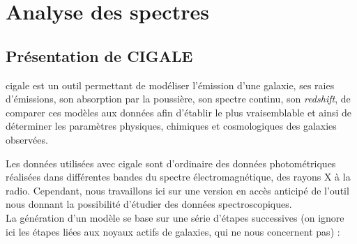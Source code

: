 \documentclass[12pt, a4paper]{article}
\begin{document}
\section{Analyse des spectres}

\subsection{Présentation de CIGALE}

\gls{cigale} \parencite{cigale} est un outil permettant de modéliser l'émission d'une galaxie, ses raies d'émissions, son absorption par la poussière, son spectre continu, son \textit{redshift}, de comparer ces modèles aux données afin d'établir le plus vraisemblable et ainsi de déterminer les paramètres physiques, chimiques et cosmologiques des galaxies observées.

Les données utilisées avec \gls{cigale} sont d'ordinaire des données photométriques réalisées dans différentes bandes du spectre électromagnétique, des rayons X à la radio. Cependant, nous travaillons ici sur une version en accès anticipé de l'outil nous donnant la possibilité d'étudier des données spectroscopiques.\\

La génération d'un modèle se base sur une série d'étapes successives (on ignore ici les étapes liées aux noyaux actifs de galaxies, qui ne nous concernent pas) :
\end{document}
